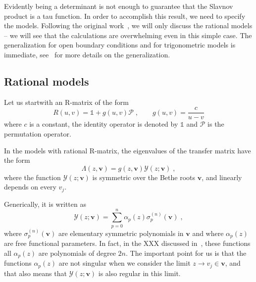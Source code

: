 \documentclass[a4paper,12pt]{amsart}
\begin{document}
Evidently being a determinant is not enough to guarantee that the
Slavnov product is a tau function.  In order to accomplish this
result, we need to specify the models. Following the original
work~\cite{Belliard:2019bfz}, we will only discuss the rational models
-- we will see that the calculations are overwhelming even in this
simple case. The generalization for open boundary conditions and for
trigonometric models is immediate, see~\cite{Slavnov:2019aba} for more
details on the generalization.


\subsection{Rational models}

Let us startwith an R-matrix of the form
\begin{equation}
  R(u,v) = \mathbb{1} + g(u,v) \mathcal{P}\; , \qquad
  g(u,v) = \frac{c}{u - v}
\end{equation}
where \(c\) is a constant, the identity operator is denoted by
\(\mathbb{1}\) and \(\mathcal{P}\) is the permutation operator.

In the models with rational R-matrix, the eigenvalues of the transfer matrix
have the form 
\begin{equation}
  \Lambda(z, \bm{v}) = g(z, \bm{v}) \mathcal{Y}(z; \bm{v})\; ,
\end{equation}
where the function \(\mathcal{Y}(z; \bm{v})\) is symmetric over the
Bethe roots \(\bm{v}\), and linearly depends on every
\(v_j\).

Generically, it is written as
\begin{equation}
  \mathcal{Y}(z; \bm{v}) = \sum_{p=0}^n \alpha_p(z) \sigma_p^{(n)}(\bm{v})\; , 
\end{equation}
where \(\sigma_p^{(n)}(\bm{v})\) are elementary symmetric polynomials
in \(\bm{v}\) and where \(\alpha_p(z)\) are free functional
parameters. In fact, in the XXX discussed in~\cite{Belliard:2019bfz},
these functions all \(\alpha_p(z)\) are polynomials of degree \(2n\).
The important point for us is that the functions \(\alpha_p(z)\) are
not singular when we consider the limit \(z \to v_j \in \bm{v}\), and
that also means that \(\mathcal{Y}(z; \bm{v})\) is also regular in
this limit.
\end{document}
